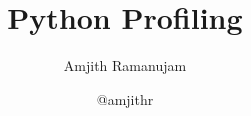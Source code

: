 \documentclass[c,english]{beamer}
\begin{document}
\title[Python Profiling]{Python Profiling%
  \label{python-profiling}}
\author[Amjith Ramanujam]{Amjith Ramanujam}
\date{@amjithr}
\maketitle














\end{document}
